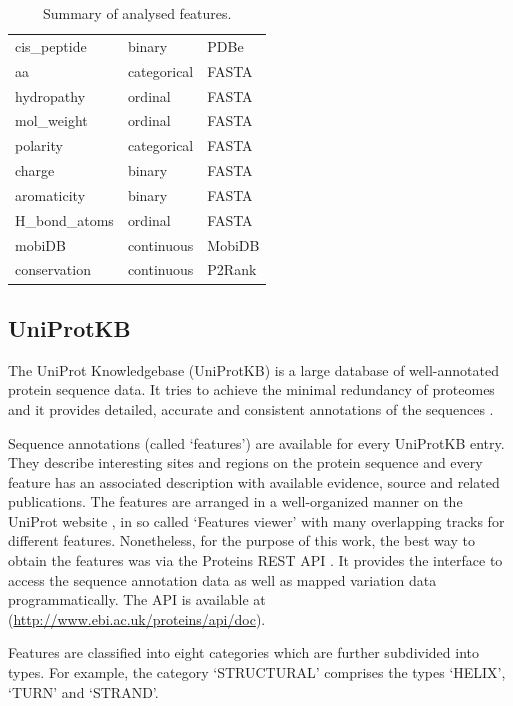 \begin{table}[]
\begin{tabular}{@{}lll@{}}
cis\_peptide         & binary      & PDBe                  \\
aa                   & categorical & FASTA                 \\
hydropathy           & ordinal     & FASTA                 \\
mol\_weight          & ordinal     & FASTA                 \\
polarity             & categorical & FASTA                 \\
charge               & binary      & FASTA                 \\
aromaticity          & binary      & FASTA                 \\
H\_bond\_atoms       & ordinal     & FASTA                 \\
mobiDB               & continuous  & MobiDB                \\
conservation         & continuous  & P2Rank \\ \bottomrule
\end{tabular}
\caption{Summary of analysed features.}
\label{tab:features}
\end{table}

\subsection{UniProtKB}

The UniProt Knowledgebase (UniProtKB) is a large database of well-annotated protein sequence data. It tries to achieve the minimal redundancy of proteomes and it provides detailed, accurate and consistent annotations of the sequences \cite{uniprot}.

Sequence annotations (called `features') are available for every UniProtKB entry. They describe interesting sites and regions on the protein sequence and every feature has an associated description with available evidence, source and related publications. The features are arranged in a well-organized manner on the UniProt website \cite{uniprot_web}, in so called `Features viewer' with many overlapping tracks for different features. Nonetheless, for the purpose of this work, the best way to obtain the features was via the Proteins REST API \cite{proteins_api}. It provides the interface to  access the sequence annotation data as well as mapped variation data programmatically. The API is available at (\url{http://www.ebi.ac.uk/proteins/api/doc}).

Features are classified into eight categories which are further subdivided into types. For example, the category `STRUCTURAL' comprises the types `HELIX', `TURN' and `STRAND'.

